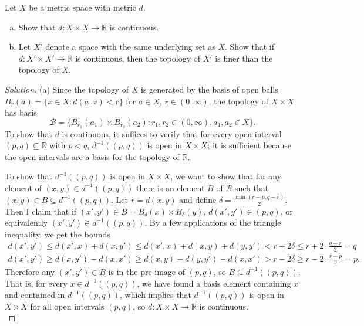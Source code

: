 \documentclass[10pt]{article}
\providecommand{\RR}{\mathbb R}
\providecommand{\ii}{\item}
\providecommand{\inv}{^{-1}}
\newenvironment{soln}{\begin{proof}[Solution]}{\end{proof}}
\begin{document}
\begin{problem}
    [Munkres 20.3]
    Let $X$ be a metric space with metric $d$.
    \begin{enumerate}[(a)]
	\ii Show that $d\colon X\times X\to\RR$ is continuous.
	\ii Let $X'$ denote a space with the same underlying set as $X$.
	Show that if $d\colon X'\times X'\to\RR$ is continuous,
	then the topology of $X'$ is finer than the topology of $X$.
\end{enumerate}
\end{problem}

\begin{soln}
    (a) Since the topology of $X$ is generated by the basis of open balls
    $B_r(a) = \{x\in X : d(a,x)<r\}$ for $a\in X$, $r\in(0,\infty)$,
    the topology of $X\times X$ has basis
    \begin{equation*}
	\mathcal B = \{ B_{r_1}(a_1)\times B_{r_2}(a_2) :
	r_1,r_2\in(0,\infty), a_1,a_2\in X\}.
    \end{equation*}
    To show that $d$ is continuous, it suffices to verify that
    for every open interval $(p,q)\subseteq\RR$ with $p<q$,
    $d\inv((p,q))$ is open in $X\times X$;
    it is sufficient because the open intervals are a basis for the topology of $\RR$.
    
    To show that $d\inv((p,q))$ is open in $X\times X$,
    we want to show that for any element of $(x,y)\in d\inv((p,q))$
    there is an element $B$ of $\mathcal B$ such that
    $(x,y)\in B\subseteq d\inv((p,q))$.
    Let $r = d(x,y)$ and define $\delta = \frac{\min(r-p, q-r)}{2}$.
    Then I claim that if $(x',y')\in B = B_\delta(x)\times B_\delta(y)$,
    $d(x',y')\in (p,q)$, or equivalently $(x',y')\in d\inv((p,q))$.
    By a few applications of the triangle inequality, we get the bounds
    \begin{align*}
        d(x',y') \le d(x',x) + d(x,y') \le d(x',x) + d(x,y) + d(y,y')
	< r + 2\delta \le r + 2\cdot\frac{q-r}2 = q\\
        d(x',y') \ge d(x,y') - d(x,x') \ge d(x,y) - d(y,y') - d(x,x')
	> r - 2\delta \ge r - 2\cdot\frac{r-p}2 = p.
    \end{align*}
    Therefore any $(x',y')\in B$ is in the pre-image of $(p,q)$,
    so $B\subseteq d\inv((p,q))$. That is, for every $x\in d\inv((p,q))$,
    we have found a basis element containing $x$ and contained in $d\inv((p,q))$,
    which implies that $d\inv((p,q))$ is open in $X\times X$
    for all open intervals $(p,q)$,
    so $d\colon X\times X\to\RR$ is continuous.
    \\


\end{soln}
\end{document}
